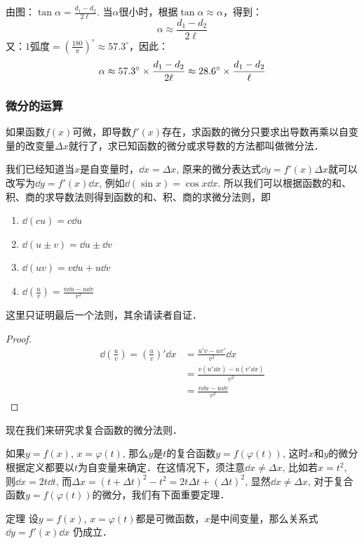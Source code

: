 \begin{solution}
由图：$\tan\alpha=\frac{d_1-d_2}{2\ell}$. 当$\alpha$很小时，根据$\tan\alpha\approx \alpha$，得到：
\[\alpha\approx \frac{d_1-d_2}{2\ell}\]
又：$1\text{弧度}=\left(\frac{180}{\pi}\right)^{\circ}\approx 57.3^{\circ}$，因此：
\[\alpha\approx 57.3^{\circ}\times \dfrac{d_1-d_2}{2\ell}\approx 28.6^{\circ}\times \dfrac{d_1-d_2}{\ell}\]
\end{solution}

\subsubsection{微分的运算}

如果函数$f(x)$可微，即导数$f'(x)$存在，求函数的微分只要求出导数再乘以自变量的改变量$\Delta x$就行了，求已知函数的微分或求导数的方法都叫做微分法．

我们已经知道当$x$是自变量时，$\dd x=\Delta x$, 原来的微分表达式$\dd y=f'(x)\Delta x$就可以改写为$\dd y=f'(x)\dd x$, 例如$\dd(\sin x)=\cos x \dd x$. 所以我们可以根据函数的和、积、商的求导数法则得到函数的和、积、商的求微分法则，即
\begin{enumerate}
    \item $\dd(cu)=c\dd u$
    \item $\dd(u\pm v)=\dd u\pm \dd v$
    \item $\dd(uv)=v\dd u+u\dd v$
    \item $\dd\left(\frac{u}{v}\right)=\frac{v\dd u-u\dd v}{v^2}$
\end{enumerate}
这里只证明最后一个法则，其余请读者自证．

\begin{proof}
\begin{align*}
\dd\left(\frac{u}{v}\right)=\left(\frac{u}{v}\right)'\dd x&=\frac{u'v-uv'}{v^2}\dd x\\
&=\frac{v(u'\dd x)-u(v'\dd x)}{v^2}\\
&=\frac{v\dd u-u\dd v}{v^2}
\end{align*}
\end{proof}


现在我们来研究求复合函数的微分法则．

如果$y=f(x)$, $x=\varphi (t)$, 那么$y$是$t$的复合函数$y=f(\varphi (t))$, 这时$x$和$y$的微分根据定义都要以$t$为自变量来确定．在这情况下，须注意$\dd x\ne \Delta x$, 比如若$x=t^2$, 则$\dd x=2t\dd t$, 而$\Delta x=(t+\Delta t)^2-t^2=2t\Delta t+(\Delta t)^2$, 显然$\dd x\ne \Delta x$, 对于复合函数$y=f(\varphi (t))$的微分，我们有下面重要定理．

\begin{blk}
    {定理} 设$y=f(x)$, $x=\varphi (t)$都是可微函数，$x$是中间变量，那么关系式
$\dd y=f' (x) \dd x$
仍成立．
\end{blk}

